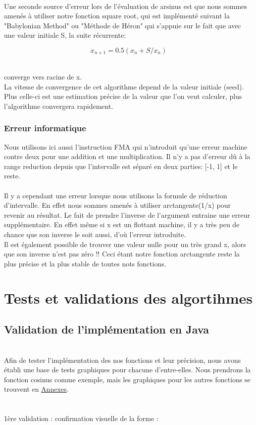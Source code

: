 \documentclass[12pt]{article}
\begin{document}
\\
Une seconde source d'erreur lors de l'évaluation de arsinus est que nous sommes amenés à utiliser notre fonction square root, qui est implémenté
suivant la "Babylonian Method" ou "Méthode de Héron" qui s'appuie sur le fait que avec une valeur initiale S, la suite récurrente:

\begin{center}
\begin{equation}
  x_{n+1} = 0.5(x_{n} + S/x_{n})
\end{equation}
\end{center}

\\
\noindent converge vers racine de x. \\
La vitesse de convergence de cet algorithme depend de la valeur initiale (seed). Plus celle-ci est une estimation précise de
la valeur que l'on veut calculer, plus l'algorithme convergera rapidement.
\subsubsection{Erreur informatique}

Nous utilisons ici aussi l'instruction FMA qui n'introduit qu'une erreur machine contre deux pour une addition et une multiplication.
Il n'y a pas d'erreur dû à la range reduction depuis que l'intervalle est séparé en deux parties: [-1, 1] et le reste.
\\
\\
Il y a cependant une erreur lorsque nous utilisons la formule de réduction d'intervalle. En effet nous sommes amenés à utiliser arctangente(1/x) pour
revenir au résultat. Le fait de prendre l'inverse de l'argument entraine une erreur supplémentaire. En effet même si x est un flottant machine, il y
a très peu de chance que son inverse le soit aussi, d'où l'erreur introduite. \\
Il est également possible de trouver une valeur nulle pour un très grand x, alors que son inverse n'est pas zéro !!
Ceci étant notre fonction arctangente reste la plus précise et la plus stable de toutes nots fonctions.

\section{Tests et validations des algortihmes}
\subsection{Validation de l'implémentation en Java}
\label{sec:tests1}
\\
Afin de tester l'implémentation des nos fonctions et leur précision, nous avons établi une base de tests
graphiques pour chacune d'entre-elles. Nous prendrons la fonction cosinus comme exemple, mais les graphiques
pour les autres fonctions se trouvent en \hyperref[sec:annexes]{Annexes}.\\
\\
\\
1ère validation : confirmation visuelle de la forme :\\
\end{document}
